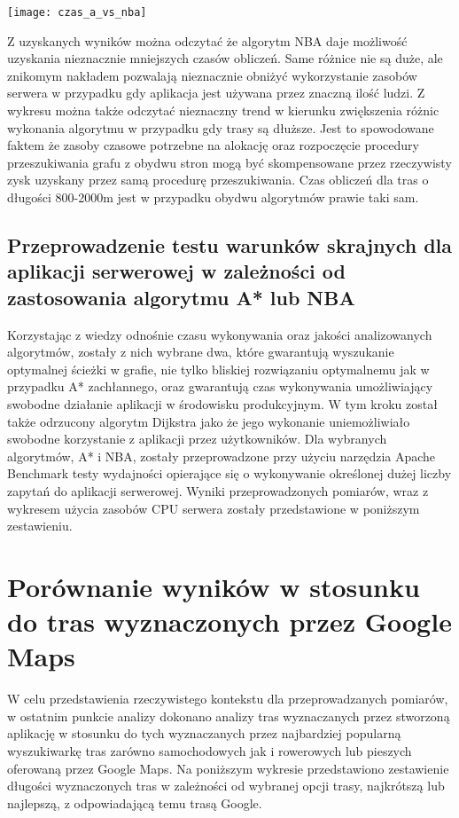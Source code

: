 \begin{center}
\texttt{[image: czas\_a\_vs\_nba]}
\end{center}

Z uzyskanych wyników można odczytać że algorytm NBA daje możliwość uzyskania nieznacznie mniejszych czasów obliczeń. Same różnice nie są duże, ale znikomym nakładem pozwalają nieznacznie obniżyć wykorzystanie zasobów serwera w przypadku gdy aplikacja jest używana przez znaczną ilość ludzi. Z wykresu można także odczytać nieznaczny trend w kierunku zwiększenia różnic wykonania algorytmu w przypadku gdy trasy są dłuższe. Jest to spowodowane faktem że zasoby czasowe potrzebne na alokację oraz rozpoczęcie procedury przeszukiwania grafu z obydwu stron mogą być skompensowane przez rzeczywisty zysk uzyskany przez samą procedurę przeszukiwania. Czas obliczeń dla tras o długości 800-2000m jest w przypadku obydwu algorytmów prawie taki sam.

\subsection{Przeprowadzenie testu warunków skrajnych dla aplikacji serwerowej w zależności od zastosowania algorytmu A* lub NBA}

Korzystając z wiedzy odnośnie czasu wykonywania oraz jakości analizowanych algorytmów, zostały z nich wybrane dwa, które gwarantują wyszukanie optymalnej ścieżki w grafie, nie tylko bliskiej rozwiązaniu optymalnemu jak w przypadku A* zachłannego, oraz gwarantują czas wykonywania umożliwiający swobodne działanie aplikacji w środowisku produkcyjnym. W tym kroku został także odrzucony algorytm Dijkstra jako że jego wykonanie uniemożliwiało swobodne korzystanie z aplikacji przez użytkowników. Dla wybranych algorytmów, A* i NBA, zostały przeprowadzone przy użyciu narzędzia Apache Benchmark testy wydajności opierające się o wykonywanie określonej dużej liczby zapytań do aplikacji serwerowej. Wyniki przeprowadzonych pomiarów, wraz z wykresem użycia zasobów CPU serwera zostały przedstawione w poniższym zestawieniu.



\section{Porównanie wyników w stosunku do tras wyznaczonych przez Google Maps}

W celu przedstawienia rzeczywistego kontekstu dla przeprowadzanych pomiarów, w ostatnim punkcie analizy dokonano analizy tras wyznaczanych przez stworzoną aplikację w stosunku do tych wyznaczanych przez najbardziej popularną wyszukiwarkę tras zarówno samochodowych jak i rowerowych lub pieszych oferowaną przez Google Maps. Na poniższym wykresie przedstawiono zestawienie długości wyznaczonych tras w zależności od wybranej opcji trasy, najkrótszą lub najlepszą, z odpowiadającą temu trasą Google.

